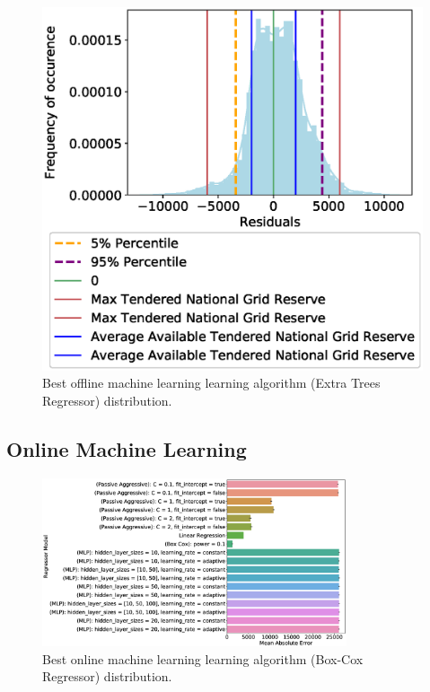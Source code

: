 \documentclass[final,3p,times,twocolumn,numbers]{elsarticle}
\begin{document}
\begin{figure}
\centering
\includegraphics[width=\columnwidth,natwidth=500,natheight=500]{figures/results/ExtraTreesRegressor_distribution_plot.eps}
\caption{Best offline machine learning learning algorithm (Extra Trees Regressor) distribution.}
\label{fig:best_offline_learning_day_distribution}
\end{figure}


\subsection{Online Machine Learning}


\begin{figure}
\includegraphics[width=0.8\textwidth]{figures/results/online_model_mae_barplot.eps}
\caption{Best online machine learning learning algorithm (Box-Cox Regressor) distribution.}
\label{fig:best_online_learning_day_distribution}
\end{figure}
\end{document}
